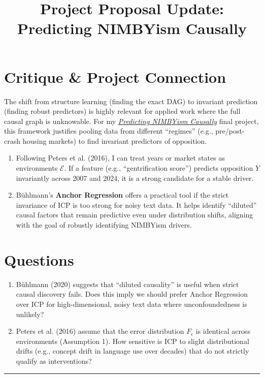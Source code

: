 \documentclass[11pt]{article}
\begin{document}
\section*{Critique \& Project Connection}
The shift from structure learning (finding the exact DAG) to invariant prediction (finding robust predictors) is highly relevant for applied work where the full causal graph is unknowable.
For my \href{https://github.com/dhardestylewis/thesis/blob/main/Blei-Invariance_Causality-2026Spring/Project_Proposal.d/Project_Proposal_Final_V21.pdf}{\textit{Predicting NIMBYism Causally}} final project, this framework justifies pooling data from different ``regimes'' (e.g., pre/post-crash housing markets) to find invariant predictors of opposition.
\begin{enumerate}
    \item Following Peters et al. (2016), I can treat years or market states as environments $\mathcal{E}$. If a feature (e.g., ``gentrification score'') predicts opposition $Y$ invariantly across 2007 and 2024, it is a strong candidate for a stable driver.
    \item Bühlmann's \textbf{Anchor Regression} offers a practical tool if the strict invariance of ICP is too strong for noisy text data. It helps identify ``diluted'' causal factors that remain predictive even under distribution shifts, aligning with the goal of robustly identifying NIMBYism drivers.
\end{enumerate}

\section*{Questions}
\begin{enumerate}
    \item Bühlmann (2020) suggests that ``diluted causality'' is useful when strict causal discovery fails. Does this imply we should prefer Anchor Regression over ICP for high-dimensional, noisy text data where unconfoundedness is unlikely?
    \item Peters et al. (2016) assume that the error distribution $F_\epsilon$ is identical across environments (Assumption 1). How sensitive is ICP to slight distributional drifts (e.g., concept drift in language use over decades) that do not strictly qualify as interventions?
\end{enumerate}

\newpage
\title{\vspace{-2em}\textbf{Project Proposal Update: Predicting NIMBYism Causally}}
\vspace{1em}
\hrule
\vspace{1em}
\end{document}
